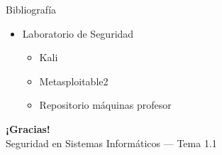 \documentclass[aspectratio=169,11pt]{beamer}
\begin{document}
\begin{frame}[allowframebreaks]{Bibliografía}
\small
\begin{itemize}
  \item Laboratorio de Seguridad
  \begin{itemize}
    \item Kali
    \item Metasploitable2
    \item Repositorio máquinas profesor
  \end{itemize}
\end{itemize}
\end{frame}

\begin{frame}[plain]
  \begin{center}
    {\Huge\bfseries\color{uznavy} ¡Gracias!}\\[1em]
    {\large Seguridad en Sistemas Informáticos --- Tema 1.1}
  \end{center}
\end{frame}
\end{document}
